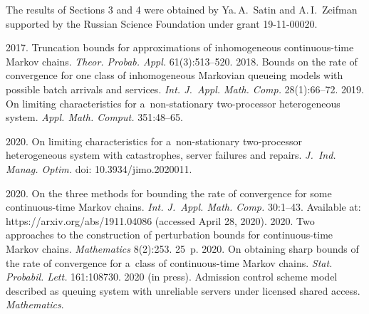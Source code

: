 
\Ack
\noindent
The results of Sections 3 and 4 were obtained by Ya.\,A.~Satin and 
A.\,I.~Zeifman supported 
by the Russian Science Foundation under grant  
19-11-00020.


 \begin{multicols}{2}

\renewcommand{\bibname}{\protect\rmfamily References}

{\small\frenchspacing
 {%
 \begin{thebibliography}{99}


 2017. 
Truncation bounds for approximations of inhomogeneous continuous-time Markov chains. 
\textit{Theor. Probab. Appl.} 61(3):513--520.
2018. Bounds on the rate of convergence for one class of inhomogeneous Markovian queueing 
models with possible batch arrivals and services. \textit{Int. J.~Appl. 
Math. Comp.} 
28(1):66--72.
 2019. On limiting 
characteristics for a~non-stationary two-processor heterogeneous system. 
\textit{Appl. Math. Comput.} 351:48--65.

 2020. On limiting 
characteristics for a~non-stationary two-processor heterogeneous system with catastrophes, 
server failures and repairs. \textit{J.~Ind. Manag. Optim.} 
doi: 10.3934/jimo.2020011.

2020. On the three methods for bounding the rate of convergence for some continuous-time 
Markov chains. \textit{Int.
J.~Appl. Math. Comp.} 30:1--43.
 Available at: https://arxiv.org/abs/1911.04086 (accessed 
April 28, 2020).
 2020. Two approaches to the construction of 
perturbation bounds for continuous-time Markov chains. 
\textit{Mathematics} 8(2):253. 25~p.
 2020. On obtaining sharp bounds of 
the rate of convergence for a~class of  
continuous-time Markov chains. \textit{Stat. Probabil. Lett.} 161:108730.
2020 (in press). Admission control scheme model described as queuing system with unreliable servers 
under licensed shared access. \textit{Mathematics}.


\end{thebibliography}}}
\end{multicols}
